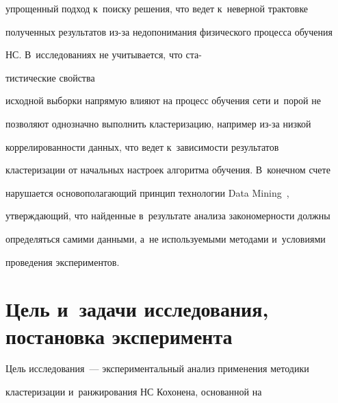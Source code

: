 упрощенный подход к~поиску решения, что ведет к~неверной трактовке 


полученных результатов из-за недопонимания физического процесса обучения 


НС. В~исследованиях не учитывается, что ста-\linebreak\vspace*{-12pt}





\pagebreak





\noindent


тистические свойства 


исходной выборки напрямую влияют на процесс обучения сети и~порой не 


позволяют однозначно выполнить кластеризацию, например из-за низкой 


коррелированности данных, что ведет к~зависимости результатов 


кластеризации от начальных настроек алгоритма обуче\-ния. В~конечном счете 


нарушается основополагающий принцип технологии Data Mining~\cite{5-anik}, 


утверждающий, что найденные в~результате анализа закономерности должны 


определяться самими данными, а~не используемыми методами и~условиями 


проведения экспериментов.





\vspace*{-4pt}


  


\section{Цель и~задачи исследования, постановка эксперимента}





\vspace*{-4pt}





  Цель исследования~--- экспериментальный анализ применения методики 


кластеризации и~ранжирования НС Кохонена, основанной на 



